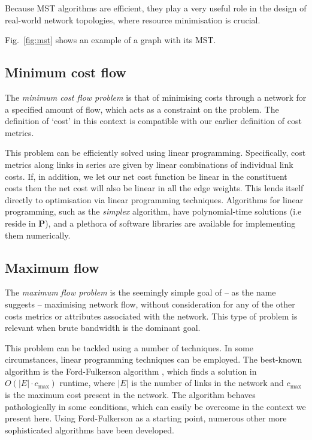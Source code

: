 \documentclass[aps,rmp,twocolumn,amsmath,amssymb,nofootinbib,superscriptaddress,longbibliography,floatfix]{revtex4-1}
\begin{document}
Because MST algorithms are efficient, they play a very useful role in the design of real-world network topologies, where resource minimisation is crucial.

Fig.~\ref{fig:mst} shows an example of a graph with its MST.

%
%

\subsection{Minimum cost flow} \label{sec:min_cost_flow_prob}

The \emph{minimum cost flow problem} \cite{???} is that of minimising costs through a network for a specified amount of flow, which acts as a constraint on the problem. The definition of `cost' in this context is compatible with our earlier definition of cost metrics.

This problem can be efficiently solved using linear programming. Specifically, cost metrics along links in series are given by linear combinations of individual link costs. If, in addition, we let our net cost function be linear in the constituent costs then the net cost will also be linear in all the edge weights. This lends itself directly to optimisation via linear programming techniques. Algorithms for linear programming, such as the \emph{simplex} algorithm, have polynomial-time solutions (i.e reside in \textbf{P}), and a plethora of software libraries are available for implementing them numerically.

%
%

\subsection{Maximum flow} \label{sec:max_flow_prob}

The \emph{maximum flow problem} \cite{???} is the seemingly simple goal of -- as the name suggests -- maximising network flow, without consideration for any of the other costs metrics or attributes associated with the network. This type of problem is relevant when brute bandwidth is the dominant goal.

This problem can be tackled using a number of techniques. In some circumstances, linear programming techniques can be employed. The best-known algorithm is the Ford-Fulkerson algorithm \cite{???}, which finds a solution in \mbox{$O(|E|\cdot c_\mathrm{max})$} runtime, where $|E|$ is the number of links in the network and $c_\mathrm{max}$ is the maximum cost present in the network. The algorithm behaves pathologically in some conditions, which can easily be overcome in the context we present here. Using Ford-Fulkerson as a starting point, numerous other more sophisticated algorithms have been developed.
\end{document}
